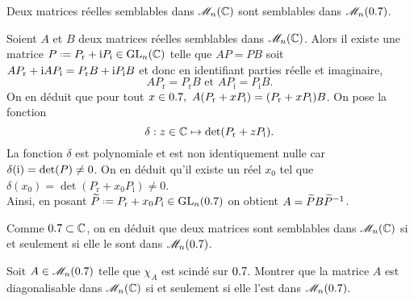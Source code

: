 \begin{prop}{}
    Deux matrices réelles semblables dans $\mathscr{M}_n(\mathbb{C})$ sont semblables dans $\mathscr{M}_n(0.7)$.
\end{prop}

\begin{preuve}
    Soient $A$ et $B$ deux matrices réelles semblables dans $\mathscr{M}_n(\mathbb{C})$. Alors il existe une matrice $P \defeq P_{\mathrm{r}} + \mi P_{\mathrm{i}} \in \Gl_n(\C)$ telle que $AP = PB$ soit $A P_{\mathrm{r}} + \mathrm{i} A P_{\mathrm{i}} = P_{\mathrm{r}} B + \mathrm{i} P_{\mathrm{i}} B$ et donc en identifiant parties réelle et imaginaire, $$A P_{\mathrm{r}} = P_{\mathrm{r}} B \text{ et } A P_{\mathrm{i}} = P_{\mathrm{i}} B.$$
    On en déduit que pour tout $x \in \R,\ A(P_{\mathrm{r}} + x P_{\mathrm{i}}) = (P_{\mathrm{r}} + x P_{\mathrm{i}})B$. On pose la fonction 
    $$\delta : z \in \mathbb{C} \mapsto \det(P_{\mathrm{r}} + z P_{\mathrm{i}}).$$ 
    La fonction $\delta$ est polynomiale et est non identiquement nulle car $\delta(\mathrm{i}) = \det(P) \not=0$. On en déduit qu'il existe un réel $x_0$ tel que $\delta(x_0) = \det(P_{\mathrm{r}} + x_0 P_{\mathrm{i}}) \not=0$. \\
    Ainsi, en posant $\widetilde{P} \defeq P_{\mathrm{r}} + x_0 P_{\mathrm{i}} \in \Gl_n(\R)$ on obtient $A = \widetilde{P}B\widetilde{P}^{-1}$.
\end{preuve}

\begin{remarque}
    Comme $0.7 \subset \mathbb{C}$, on en déduit que deux matrices sont semblables dans $\mathscr{M}_n(\mathbb{C})$ si et seulement si elle le sont dans $\mathscr{M}_n(0.7)$.
\end{remarque}

\begin{exercice}
    Soit $A \in \mathscr{M}_n(0.7)$ telle que $\chi_A$ est scindé sur $0.7$. Montrer que la matrice $A$ est diagonalisable dans $\mathscr{M}_n(\mathbb{C})$ si et seulement si elle l'est dans $\mathscr{M}_n(0.7)$.
\end{exercice}